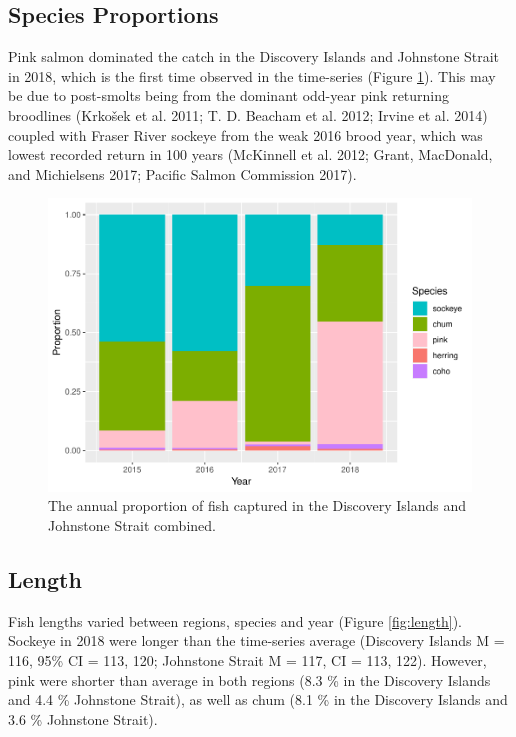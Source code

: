 \documentclass[fleqn,10pt]{wlpeerj} %
\begin{document}
\subsection*{Species Proportions}\label{species-proportions}

Pink salmon dominated the catch in the Discovery Islands and Johnstone
Strait in 2018, which is the first time observed in the time-series
(Figure \ref{fig:prop}). This may be due to post-smolts being from the
dominant odd-year pink returning broodlines (Krkošek et al. 2011; T. D.
Beacham et al. 2012; Irvine et al. 2014) coupled with Fraser River
sockeye from the weak 2016 brood year, which was lowest recorded return
in 100 years (McKinnell et al. 2012; Grant, MacDonald, and Michielsens
2017; Pacific Salmon Commission 2017).

\begin{figure}[H]
\includegraphics[width=0.8\linewidth]{peer_j_migration_dynamics_files/figure-latex/prop-1} \caption{The annual proportion of fish captured in the Discovery Islands and Johnstone Strait combined.}\label{fig:prop}
\end{figure}

\subsection*{Length}\label{length}

Fish lengths varied between regions, species and year (Figure
\ref{fig:length}). Sockeye in 2018 were longer than the time-series
average (Discovery Islands M = 116, 95\% CI = 113, 120; Johnstone Strait
M = 117, CI = 113, 122). However, pink were shorter than average in both
regions (8.3 \% in the Discovery Islands and 4.4 \% Johnstone Strait),
as well as chum (8.1 \% in the Discovery Islands and 3.6 \% Johnstone
Strait).
\end{document}
